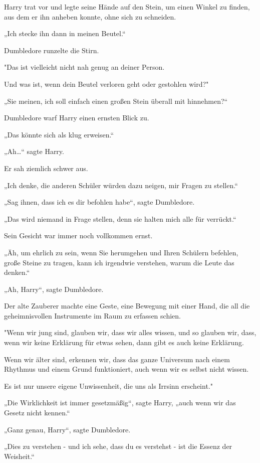 {Harry trat vor und legte seine Hände auf den Stein, um einen Winkel zu finden, aus dem er ihn anheben konnte, ohne sich zu schneiden.

„Ich stecke ihn dann in meinen Beutel.“

Dumbledore runzelte die Stirn.

"Das ist vielleicht nicht nah genug an deiner Person.

Und was ist, wenn dein Beutel verloren geht oder gestohlen wird?"

„Sie meinen, ich soll einfach einen großen Stein überall mit hinnehmen?“

Dumbledore warf Harry einen ernsten Blick zu.

„Das könnte sich als klug erweisen.“

„Ah…“ sagte Harry.

Er sah ziemlich schwer aus.

„Ich denke, die anderen Schüler würden dazu neigen, mir Fragen zu stellen.“

„Sag ihnen, dass ich es dir befohlen habe“, sagte Dumbledore.

„Das wird niemand in Frage stellen, denn sie halten mich alle für verrückt.“

Sein Gesicht war immer noch vollkommen ernst.

„Äh, um ehrlich zu sein, wenn Sie herumgehen und Ihren Schülern befehlen, große Steine zu tragen, kann ich irgendwie verstehen, warum die Leute das denken.“

„Ah, Harry“, sagte Dumbledore.

Der alte Zauberer machte eine Geste, eine Bewegung mit einer Hand, die all die geheimnisvollen Instrumente im Raum zu erfassen schien.

"Wenn wir jung sind, glauben wir, dass wir alles wissen, und so glauben wir, dass, wenn wir keine Erklärung für etwas sehen, dann gibt es auch keine Erklärung.

Wenn wir älter sind, erkennen wir, dass das ganze Universum nach einem Rhythmus und einem Grund funktioniert, auch wenn wir es selbst nicht wissen.

Es ist nur unsere eigene Unwissenheit, die uns als Irrsinn erscheint."

„Die Wirklichkeit ist immer gesetzmäßig“, sagte Harry, „auch wenn wir das Gesetz nicht kennen.“

„Ganz genau, Harry“, sagte Dumbledore.

„Dies zu verstehen - und ich sehe, dass du es verstehst - ist die Essenz der Weisheit.“

}
